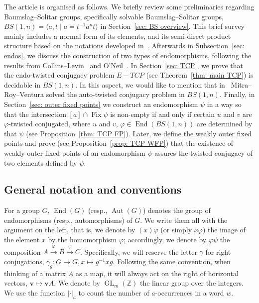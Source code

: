\documentclass[a4paper]{amsart}
\theoremstyle{definition}
\newcommand\ZZ{\mathbb{Z}}
\newcommand{\GL}{\operatorname{GL}}
\newcommand{\Aut}{\operatorname{Aut}}
\newcommand{\End}{\operatorname{End}}
\newcommand{\Fix}{\operatorname{Fix}}
\begin{document}
The article is organised as follows. We briefly review some preliminaries regarding Baumslag--Solitar groups, specifically solvable Baumslag--Solitar groups, $BS(1,n) = \langle a, t \mid  a  = t^{-1} a^n t\rangle $ in Section~\ref{sec: BS overview}. This brief survey mainly includes a normal form of its elements, and its semi-direct product structure based on the notations developed in~\cite{Roy-Ventura-Mitra}. Afterwards in Subsection~\ref{sec: endos}, we discuss the construction of two types of endomorphisms, following the results from Collins--Levin~\cite{CoLe} and O'Neil~\cite{N}.
In Section~\ref{sec: TCP}, we prove that the endo-twisted conjugacy problem $E-TCP$ (see Theorem~\ref{thm: main TCP}) is decidable in $BS(1,n)$. In this aspect, we would like to mention that in~\cite{Roy-Ventura-Mitra} Mitra--Roy--Ventura solved the auto-twisted conjugacy problem in $BS(1,n)$.
Finally, in Section~\ref{sec: outer fixed points} we construct an endomorphism $\psi$ in a way so that the intersection $[a] \cap \Fix \psi$ is non-empty if and only if certain $u$ and $v$ are $\varphi$-twisted conjugated, where $u$ and $v$, $\varphi \in \End(BS(1,n))$ are determined by that $\psi$ (see Proposition~\ref{thm: TCP FP}). Later, we define the weakly outer fixed points and prove (see Proposition~\ref{prop: TCP WFP}) that the existence of weakly outer fixed points of an endomorphism $\psi$ assures the twisted conjugacy of two elements defined by $\psi$.


\subsection*{General notation and conventions}

For a group $G$, $\End(G)$ (resp., $\Aut(G)$) denotes the group of endomorphisms (resp., automorphisms) of $G$. We write them all with the argument on the left, that is, we denote by $(x)\varphi$ (or simply $x\varphi$) the image of the element $x$ by the homomorphism $\varphi$; accordingly, we denote by $\varphi \psi$ the composition $A \xrightarrow{\varphi} B \xrightarrow{\psi} C$. Specifically, we will reserve the letter $\gamma$ for right conjugations, $\gamma_g \colon G \to G, x\mapsto g^{-1}xg$. Following the same convention, when thinking of a matrix $A$ as a map, it will always act on the right of horizontal vectors, $\textbf{v}\mapsto \textbf{v}A$. We denote by $\GL_m(\ZZ)$ the linear group over the integers. We use the function $| \cdot |_a$ to count the number of $a$-occurrences in a word $w$.
\end{document}
